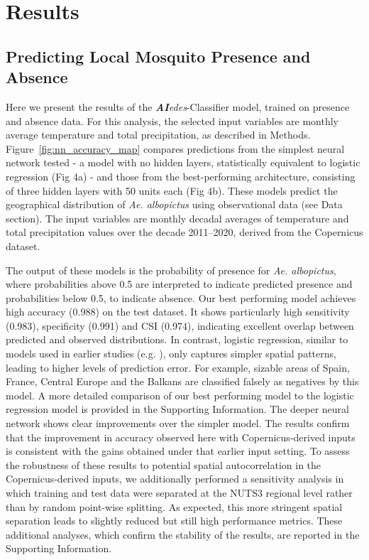 \documentclass[preprint,12pt]{elsarticle}
\begin{document}
\section{Results}

\subsection{Predicting Local Mosquito Presence and Absence}

Here we present the results of the \textit{\textbf{AI}edes}-Classifier model, trained on presence and absence data. For this analysis, the selected input variables are monthly average temperature and total precipitation, as described in Methods. Figure~\ref{fig:nn_accuracy_map} compares predictions from the simplest neural network tested - a model with no hidden layers, statistically equivalent to logistic regression (Fig 4a) - and those from the best-performing architecture, consisting of three hidden layers with 50 units each (Fig 4b). These models predict the geographical distribution of \textit{Ae. albopictus} using observational data (see Data section). The input variables are monthly decadal averages of temperature and total precipitation values over the decade 2011–2020, derived from the Copernicus dataset.


The output of these models is the probability of presence for \textit{Ae. albopictus}, where probabilities above 0.5 are interpreted to indicate predicted presence and probabilities below 0.5, to indicate absence. Our best performing model achieves high accuracy (0.988) on the test dataset. It shows particularly high sensitivity (0.983), specificity (0.991) and CSI (0.974), indicating excellent overlap between predicted and observed distributions. In contrast, logistic regression, similar to models used in earlier studies (e.g. \cite{zardini2024}), only captures simpler spatial patterns, leading to higher levels of prediction error. For example, sizable areas of Spain, France, Central Europe and the Balkans are classified falsely as negatives by this model. A more detailed comparison of our best performing model to the logistic regression model is provided in the Supporting Information. The deeper neural network shows clear improvements over the simpler model. The results confirm that the improvement in accuracy observed here with Copernicus-derived inputs is consistent with the gains obtained under that earlier input setting.
To assess the robustness of these results to potential spatial autocorrelation in the Copernicus-derived inputs, we additionally performed a sensitivity analysis in which training and test data were separated at the NUTS3 regional level rather than by random point-wise splitting. As expected, this more stringent spatial separation leads to slightly reduced but still high performance metrics. These additional analyses, which confirm the stability of the results, are reported in the Supporting Information.
\end{document}
